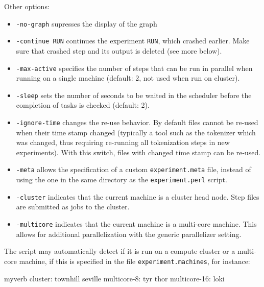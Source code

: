 Other options:

\begin{itemize}
\item {\tt -no-graph} supresses the display of the graph

\item {\tt -continue RUN} continues the experiment {\tt RUN}, which crashed earlier. Make sure that crashed step and its output is deleted (see more below).

\item {\tt -max-active} specifies the number of steps that can be run in parallel when running on a single machine (default: 2, not used when run on cluster).

\item {\tt -sleep} sets the number of seconds to be waited in the scheduler before the completion of tasks is checked (default: 2).

\item {\tt -ignore-time} changes the re-use behavior. By default files cannot be re-used when their time stamp changed (typically a tool such as the tokenizer which was changed, thus requiring re-running all tokenization steps in new experiments). With this switch, files with changed time stamp can be re-used.

\item {\tt -meta} allows the specification of a custom {\tt experiment.meta} file, instead of using the one in the same directory as the {\tt experiment.perl} script.

\item {\tt -cluster} indicates that the current machine is a cluster head node. Step files are submitted as jobs to the cluster.

\item {\tt -multicore} indicates that the current machine is a multi-core machine. This allows for additional parallelization with the generic parallelizer setting.

\end{itemize}

The script may automatically detect if it is run on a compute cluster or a multi-core machine, if this is specified in the file {\tt experiment.machines}, for instance:

\begin{SaveVerbatim}{myverb}
 cluster: townhill seville
 multicore-8: tyr thor
 multicore-16: loki
\end{SaveVerbatim}
\colorbox{gray}{%
}

